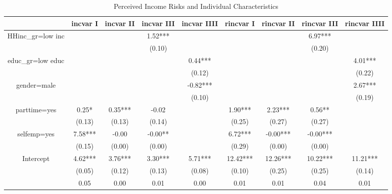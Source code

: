 \documentclass[12pt,notitlepage,onecolumn,aps,pra]{article}
\begin{document}
\begin{table}[p]
\centering
\begin{adjustbox}{width=\textwidth}
\begin{threeparttable}
\caption{Perceived Income Risks and Individual Characteristics}
\label{micro_reg}\begin{tabular}{ccccccccc}
\toprule
{} & incvar I & incvar II & incvar III & incvar IIII & rincvar I & rincvar II & rincvar III & rincvar IIII \\
\midrule
HHinc\_gr=low inc &          &           &    1.52*** &             &           &            &     6.97*** &              \\
                 &          &           &     (0.10) &             &           &            &      (0.20) &              \\
educ\_gr=low educ &          &           &            &     0.44*** &           &            &             &      4.01*** \\
                 &          &           &            &      (0.12) &           &            &             &       (0.22) \\
gender=male      &          &           &            &    -0.82*** &           &            &             &      2.67*** \\
                 &          &           &            &      (0.10) &           &            &             &       (0.19) \\
parttime=yes     &    0.25* &   0.35*** &      -0.02 &             &   1.90*** &    2.23*** &      0.56** &              \\
                 &   (0.13) &    (0.13) &     (0.14) &             &    (0.25) &     (0.27) &      (0.27) &              \\
selfemp=yes      &  7.58*** &     -0.00 &    -0.00** &             &   6.72*** &   -0.00*** &    -0.00*** &              \\
                 &   (0.15) &    (0.00) &     (0.00) &             &    (0.29) &     (0.00) &      (0.00) &              \\
Intercept        &  4.62*** &   3.76*** &    3.30*** &     5.71*** &  12.42*** &   12.26*** &    10.22*** &     11.21*** \\
                 &   (0.05) &    (0.12) &     (0.13) &      (0.08) &    (0.10) &     (0.25) &      (0.25) &       (0.14) \\
                 &     0.05 &      0.00 &       0.01 &        0.00 &      0.01 &       0.01 &        0.04 &         0.01 \\

\end{tabular}
\end{threeparttable}
\end{adjustbox}
\end{table}
\end{document}
